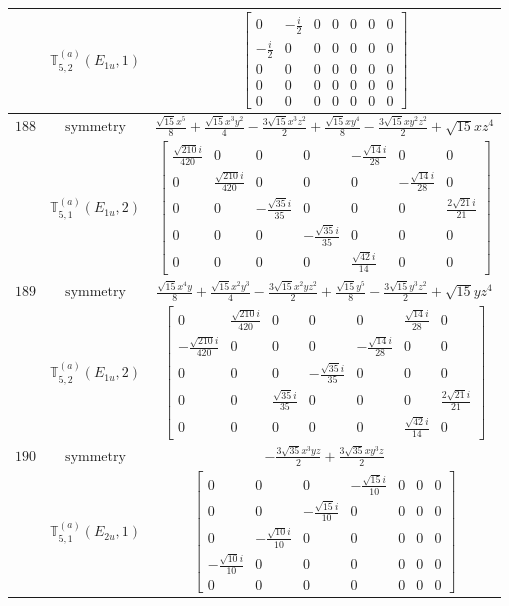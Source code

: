 \documentclass[fleqn,8pt,landscape]{jsarticle}
\begin{document}
\begin{longtable}{ccc}
$  $ & $ \mathbb{T}_{5,2}^{(a)}(E_{1u},1) $ & $ \begin{bmatrix} 0 & - \frac{i}{2} & 0 & 0 & 0 & 0 & 0 \\ - \frac{i}{2} & 0 & 0 & 0 & 0 & 0 & 0 \\ 0 & 0 & 0 & 0 & 0 & 0 & 0 \\ 0 & 0 & 0 & 0 & 0 & 0 & 0 \\ 0 & 0 & 0 & 0 & 0 & 0 & 0 \end{bmatrix} $ \\ \hline
$ 188 $ & $ \text{symmetry} $ & $ \frac{\sqrt{15} x^{5}}{8} + \frac{\sqrt{15} x^{3} y^{2}}{4} - \frac{3 \sqrt{15} x^{3} z^{2}}{2} + \frac{\sqrt{15} x y^{4}}{8} - \frac{3 \sqrt{15} x y^{2} z^{2}}{2} + \sqrt{15} x z^{4} $ \\
$  $ & $ \mathbb{T}_{5,1}^{(a)}(E_{1u},2) $ & $ \begin{bmatrix} \frac{\sqrt{210} i}{420} & 0 & 0 & 0 & - \frac{\sqrt{14} i}{28} & 0 & 0 \\ 0 & \frac{\sqrt{210} i}{420} & 0 & 0 & 0 & - \frac{\sqrt{14} i}{28} & 0 \\ 0 & 0 & - \frac{\sqrt{35} i}{35} & 0 & 0 & 0 & \frac{2 \sqrt{21} i}{21} \\ 0 & 0 & 0 & - \frac{\sqrt{35} i}{35} & 0 & 0 & 0 \\ 0 & 0 & 0 & 0 & \frac{\sqrt{42} i}{14} & 0 & 0 \end{bmatrix} $ \\ \hline
$ 189 $ & $ \text{symmetry} $ & $ \frac{\sqrt{15} x^{4} y}{8} + \frac{\sqrt{15} x^{2} y^{3}}{4} - \frac{3 \sqrt{15} x^{2} y z^{2}}{2} + \frac{\sqrt{15} y^{5}}{8} - \frac{3 \sqrt{15} y^{3} z^{2}}{2} + \sqrt{15} y z^{4} $ \\
$  $ & $ \mathbb{T}_{5,2}^{(a)}(E_{1u},2) $ & $ \begin{bmatrix} 0 & \frac{\sqrt{210} i}{420} & 0 & 0 & 0 & \frac{\sqrt{14} i}{28} & 0 \\ - \frac{\sqrt{210} i}{420} & 0 & 0 & 0 & - \frac{\sqrt{14} i}{28} & 0 & 0 \\ 0 & 0 & 0 & - \frac{\sqrt{35} i}{35} & 0 & 0 & 0 \\ 0 & 0 & \frac{\sqrt{35} i}{35} & 0 & 0 & 0 & \frac{2 \sqrt{21} i}{21} \\ 0 & 0 & 0 & 0 & 0 & \frac{\sqrt{42} i}{14} & 0 \end{bmatrix} $ \\ \hline
$ 190 $ & $ \text{symmetry} $ & $ - \frac{3 \sqrt{35} x^{3} y z}{2} + \frac{3 \sqrt{35} x y^{3} z}{2} $ \\
$  $ & $ \mathbb{T}_{5,1}^{(a)}(E_{2u},1) $ & $ \begin{bmatrix} 0 & 0 & 0 & - \frac{\sqrt{15} i}{10} & 0 & 0 & 0 \\ 0 & 0 & - \frac{\sqrt{15} i}{10} & 0 & 0 & 0 & 0 \\ 0 & - \frac{\sqrt{10} i}{10} & 0 & 0 & 0 & 0 & 0 \\ - \frac{\sqrt{10} i}{10} & 0 & 0 & 0 & 0 & 0 & 0 \\ 0 & 0 & 0 & 0 & 0 & 0 & 0 \end{bmatrix} $ \\ \hline

\end{longtable}
\end{document}
